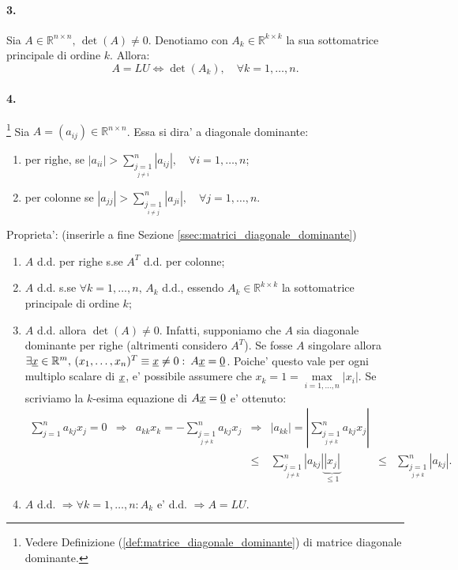 \paragraph{3.} Sia $A\in\mathbb{R}^{n \times n},\, \det(A)\neq 0$. Denotiamo con $A_k\in\mathbb{R}^{k\times k}$ la sua sottomatrice principale di ordine $k$. Allora:
\begin{equation*}
	A = LU \iff \det(A_k),\quad\forall k=1,\hdots, n.
\end{equation*}

\paragraph{4.}\footnote{Vedere Definizione (\ref{def:matrice_diagonale_dominante}) di matrice diagonale dominante.} Sia $A=(a_{ij})\in\mathbb{R}^{n \times n}$. Essa si dira' a diagonale dominante:
\begin{enumerate}
	\item per righe, se $|a_{ii}|>\sum_{\underset{j\neq i}{j=1}}^n |a_{ij}|,\quad 
	\forall i=1,\hdots, n$;
	\item per colonne se $|a_{jj}|>\sum_{\underset{i\neq j}{j=1}}^n|a_{ji}|,\quad \forall j=1,\hdots,n$.
\end{enumerate}
Proprieta': (inserirle a fine Sezione \ref{ssec:matrici_diagonale_dominante})
\begin{enumerate}
	\item $A$ d.d. per righe s.se $A^T$ d.d. per colonne;
	\item $A$ d.d. s.se $\forall k=1,\hdots, n,\, A_k$ d.d., essendo $A_k\in\mathbb{R}^{k\times k}$ la sottomatrice principale di ordine $k$;
	\item $A$ d.d. allora $\det(A)\neq 0$. Infatti, supponiamo che $A$ sia diagonale dominante per righe (altrimenti considero $A^T$). Se fosse $A$ singolare allora $\exists \uline x\in\mathbb{R}^m,\, (x_1,\hdots, x_n)^T\equiv \uline x \neq 0\,\colon\, A\uline x = \uline 0$. Poiche' questo vale per ogni multiplo scalare di $\uline x$, e' possibile assumere che $x_k=1=\underset{i=1,\hdots, n}{\max}|x_i|$. Se scriviamo la $k$-esima equazione di $A\uline x=\uline 0$ e' ottenuto:
	\begin{equation*}
		\begin{matrix}
			\sum_{j=1}^{n}a_{kj} x_j=0 &\Rightarrow& a_{kk}x_k = -\sum_{\underset{j\neq k}{j=1}}^{n}a_{kj} x_j  &\Rightarrow& |a_{kk}|=|\sum_{\underset{j\neq k}{j=1}}^{n}a_{kj} x_j|\\
			&&&\leq& \sum_{\underset{j\neq k}{j=1}}^{n}|a_{kj}| \underbrace{|x_j|}_{\leq 1} &\leq& \sum_{\underset{j\neq k}{j=1}}^{n}|a_{kj}|.
		\end{matrix}
	\end{equation*}
	\item $A$ d.d. $\Rightarrow\forall k=1,\hdots,n\colon A_k$ e' d.d. $\Rightarrow A=LU$.
\end{enumerate}

